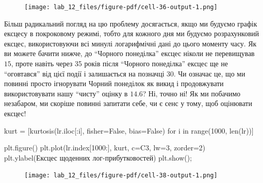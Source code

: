 \documentclass[
  letterpaper,
]{report}
\newenvironment{Shaded}{\begin{snugshade}}{\end{snugshade}}
\newcommand{\BuiltInTok}[1]{\textcolor[rgb]{0.00,0.23,0.31}{#1}}
\newcommand{\ControlFlowTok}[1]{\textcolor[rgb]{0.00,0.23,0.31}{#1}}
\newcommand{\DecValTok}[1]{\textcolor[rgb]{0.68,0.00,0.00}{#1}}
\newcommand{\KeywordTok}[1]{\textcolor[rgb]{0.00,0.23,0.31}{#1}}
\newcommand{\NormalTok}[1]{\textcolor[rgb]{0.00,0.23,0.31}{#1}}
\newcommand{\OperatorTok}[1]{\textcolor[rgb]{0.37,0.37,0.37}{#1}}
\newcommand{\StringTok}[1]{\textcolor[rgb]{0.13,0.47,0.30}{#1}}
\newcommand{\VariableTok}[1]{\textcolor[rgb]{0.07,0.07,0.07}{#1}}
\begin{document}
\begin{figure}[H]

{\centering \texttt{[image: lab\_12\_files/figure-pdf/cell-36-output-1.png]}

}

\end{figure}

Більш радикальний погляд на цю проблему досягається, якщо ми будуємо
графік ексцесу в покроковому режимі, тобто для кожного дня ми будуємо
розрахунковий ексцес, використовуючи всі минулі логарифмічні дані до
цього моменту часу. Як ви можете бачити нижче, до ``Чорного понеділка''
ексцес ніколи не перевищував \(15\), проте навіть через 35 років після
``Чорного понеділка'' ексцес ще не ``оговтався'' від цієї події і
залишається на позначці 30. Чи означає це, що ми повинні просто
ігнорувати Чорний понеділок як викид і продовжувати використовувати нашу
``чисту'' оцінку в \(14.6\)? Ні, точно ні! Як ми побачимо незабаром, ми
скоріше повинні запитати себе, чи є сенс у тому, щоб оцінювати ексцес!

\begin{Shaded}
\begin{Highlighting}[]
\NormalTok{kurt }\OperatorTok{=}\NormalTok{ [kurtosis(lr.iloc[:i], fisher}\OperatorTok{=}\VariableTok{False}\NormalTok{, bias}\OperatorTok{=}\VariableTok{False}\NormalTok{) }\ControlFlowTok{for}\NormalTok{ i }\KeywordTok{in} \BuiltInTok{range}\NormalTok{(}\DecValTok{1000}\NormalTok{, }\BuiltInTok{len}\NormalTok{(lr))]}
\end{Highlighting}
\end{Shaded}

\begin{Shaded}
\begin{Highlighting}[]
\NormalTok{plt.figure()}
\NormalTok{plt.plot(lr.index[}\DecValTok{1000}\NormalTok{:], kurt, c}\OperatorTok{=}\StringTok{\textquotesingle{}C3\textquotesingle{}}\NormalTok{, lw}\OperatorTok{=}\DecValTok{3}\NormalTok{, zorder}\OperatorTok{=}\DecValTok{2}\NormalTok{)}
\NormalTok{plt.ylabel(}\StringTok{\textquotesingle{}Ексцес щоденних лог{-}прибутковостей\textquotesingle{}}\NormalTok{)}
\NormalTok{plt.show()}\OperatorTok{;}
\end{Highlighting}
\end{Shaded}

\begin{figure}[H]

{\centering \texttt{[image: lab\_12\_files/figure-pdf/cell-38-output-1.png]}

}

\end{figure}
\end{document}
